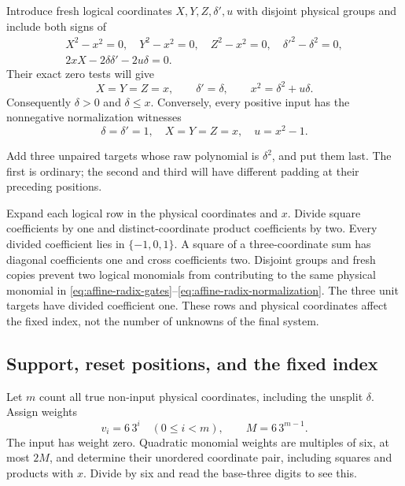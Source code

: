 Introduce fresh logical coordinates $X,Y,Z,\delta',u$ with
disjoint physical groups and include both signs of
\begin{equation}\label{eq:affine-radix-normalization}
 \begin{gathered}
 X^2-x^2=0,\quad Y^2-x^2=0,\quad Z^2-x^2=0,\quad
 \delta'^2-\delta^2=0,\\
 2xX-2\delta\delta'-2u\delta=0.
 \end{gathered}
\end{equation}
Their exact zero tests will give
\begin{equation}\label{eq:affine-radix-guard}
 X=Y=Z=x,\qquad \delta'=\delta,\qquad
 x^2=\delta^2+u\delta.
\end{equation}
Consequently $\delta>0$ and $\delta\le x$. Conversely, every
positive input has the nonnegative normalization witnesses
\begin{equation}\label{eq:affine-radix-unit-witness}
 \delta=\delta'=1,\quad X=Y=Z=x,\quad u=x^2-1.
\end{equation}

Add three unpaired targets whose raw polynomial is $\delta^2$,
and put them last. The first is ordinary; the second and third
will have different padding at their preceding positions.

Expand each logical row in the physical coordinates and $x$.
Divide square coefficients by one and distinct-coordinate product
coefficients by two. Every divided coefficient lies in
$\{-1,0,1\}$. A square of a three-coordinate sum has diagonal
coefficients one and cross coefficients two. Disjoint groups and
fresh copies prevent two logical monomials from contributing to
the same physical monomial in
\eqref{eq:affine-radix-gates}--\eqref{eq:affine-radix-normalization}.
The three unit targets have divided coefficient one. These rows
and physical coordinates affect the fixed index, not the number
of unknowns of the final system.

\subsection{Support, reset positions, and the fixed index}

Let $m$ count all true non-input physical coordinates, including
the unsplit $\delta$. Assign weights
\[
 v_i=6\,3^i\quad(0\le i<m),\qquad M=6\,3^{m-1}.
\]
The input has weight zero. Quadratic monomial weights are
multiples of six, at most $2M$, and determine their unordered
coordinate pair, including squares and products with $x$.
Divide by six and read the base-three digits to see this.

